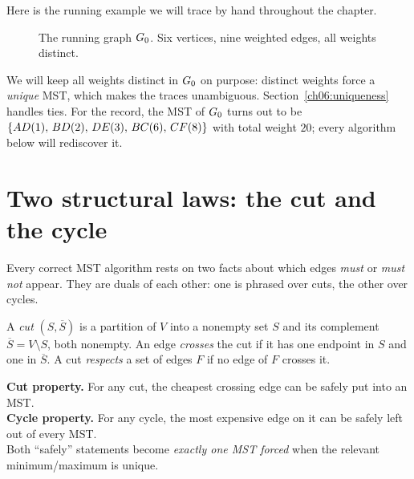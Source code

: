 Here is the running example we will trace by hand throughout the chapter.

\begin{figure}[H]
\centering
{}
\caption{The running graph $G_0$. Six vertices, nine weighted edges, all weights distinct.}
\label{ch06:running-graph}
\end{figure}

We will keep all weights distinct in $G_0$ on purpose: distinct weights force a \emph{unique} MST, which makes the traces unambiguous. Section~\ref{ch06:uniqueness} handles ties. For the record, the MST of $G_0$ turns out to be $\{AD(1),\,BD(2),\,DE(3),\,BC(6),\,CF(8)\}$ with total weight $20$; every algorithm below will rediscover it.

\section{Two structural laws: the cut and the cycle}

Every correct MST algorithm rests on two facts about which edges \emph{must} or \emph{must not} appear. They are duals of each other: one is phrased over cuts, the other over cycles.

\begin{definition}[Cut]
A \emph{cut} $(S,\overline S)$ is a partition of $V$ into a nonempty set $S$ and its complement $\overline S=V\setminus S$, both nonempty. An edge \emph{crosses} the cut if it has one endpoint in $S$ and one in $\overline S$. A cut \emph{respects} a set of edges $F$ if no edge of $F$ crosses it.
\end{definition}

\begin{focusbox}
\textbf{Cut property.} For any cut, the cheapest crossing edge can be safely put into an MST. \\
\textbf{Cycle property.} For any cycle, the most expensive edge on it can be safely left out of every MST. \\
Both ``safely'' statements become \emph{exactly one MST forced} when the relevant minimum/maximum is unique.
\end{focusbox}

